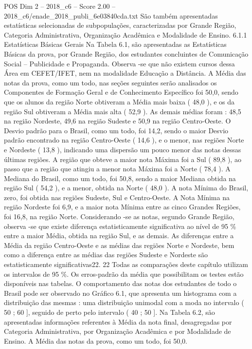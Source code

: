 \begin{textsample}{POS Dim 2 – 2018\_c6 – Score 2.00 – 2018\_c6/enade\_2018\_publi\_6e03840cda.txt}
São também apresentadas estatísticas selecionadas de subpopulações, caracterizadas por Grande Região, Categoria Administrativa, Organização Acadêmica e Modalidade de Ensino. 6.1.1 Estatísticas Básicas Gerais Na Tabela 6.1, são apresentadas as Estatísticas Básicas da prova, por Grande Região, dos estudantes concluintes de Comunicação Social – Publicidade e Propaganda.
Observa -se que não existem cursos dessa Área em CEFET/IFET, nem na modalidade Educação a Distância.
A Média das notas da prova, como um todo, nas seções seguintes serão analisados os Componentes de Formação Geral e de Conhecimento Específico foi 50,0, sendo que os alunos da região Norte obtiveram a Média mais baixa ( 48,0 ), e os da região Sul obtiveram a Média mais alta ( 52,9 ).
As demais médias foram : 48,5 na região Nordeste, 49,6 na região Sudeste e 50,9 na região Centro-Oeste.
O Desvio padrão para o Brasil, como um todo, foi 14,2, sendo o maior Desvio padrão encontrado na região Centro-Oeste ( 14,6 ), e o menor, nas regiões Norte e Nordeste ( 13,8 ), indicando uma dispersão um pouco menor das notas dessas últimas regiões.
A região que obteve a maior nota Máxima foi a Sul ( 89,8 ), ao passo que a região que atingiu a menor nota Máxima foi a Norte ( 78,4 ).
A Mediana do Brasil, como um todo, foi 50,8, sendo a maior Mediana obtida na região Sul ( 54,2 ), e a menor, obtida na Norte ( 48,0 ).
A nota Mínima do Brasil, zero, foi obtida nas regiões Sudeste, Sul e Centro-Oeste.
A Nota Mínima na região Nordeste foi 6,9, e a maior nota Mínima entre as cinco Grandes Regiões, foi 16,8, na região Norte.
Considerando -se as notas, segundo Grande Região, observa -se que existe diferença estatisticamente significativa ao nível de 95 \% entre a maior Média, obtida na região Sul, e as demais.
As diferenças entre a Média da região Centro-Oeste e as médias das regiões Norte e Nordeste, bem como a diferença entre as médias das regiões Sudeste e Nordeste são estatisticamente significativas22. 22 Todas as comparações deste capítulo utilizam os intervalos de 95 \%.
Os erros-padrão da média que possibilitam os testes estão disponíveis nas tabelas.
O comportamento das notas dos estudantes de todo o Brasil pode ser observado no Gráfico 6.1, que apresenta um histograma com a distribuição das mesmas : uma distribuição unimodal com a moda no intervalo ( 50 ; 60 ], seguido de perto pelo intervalo ( 40 ; 50 ].
Na Tabela 6.2, são apresentadas informações referentes à Média da nota final, desagregadas por Categoria Administrativa, por Organização Acadêmica e por Modalidade de Ensino.
A Média das notas da prova, como um todo, foi 50,0.

\end{textsample}
